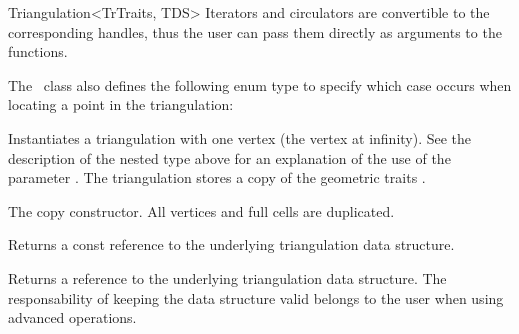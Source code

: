\begin{ccRefClass}{Triangulation<TrTraits, TDS>}
Iterators and circulators are convertible to the corresponding handles, thus
the user can pass them directly as arguments to the functions.

\ccGlue{}

\ccGlue{}


\ccGlue{}

The \ccRefName\ class also defines the following enum type to specify
which case occurs when locating a point in the triangulation:


\ccCreation
{}

{Instantiates a triangulation with one vertex (the vertex at infinity). See the
description of the nested type  above for an
explanation of the use of the parameter . The triangulation stores a copy
of the geometric traits .}

{The copy constructor. All vertices and full cells are duplicated.}


%
{Returns a const reference to the underlying triangulation data structure.}

\begin{ccAdvanced}
%
{Returns a %
reference to the underlying triangulation data structure.
The responsability of keeping the data structure valid belongs to the
user when using advanced operations.}
\end{ccAdvanced}


\end{ccRefClass}
